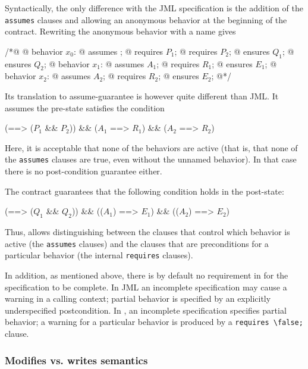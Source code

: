 \noindent
Syntactically, the only difference with the JML specification is the
addition of the \lstinline|assumes| clauses and allowing an 
anonymous behavior at the beginning of the contract. Rewriting the anonymous behavior with a name gives

\begin{listing}{1}
	/*@ 
	@ behavior $x_0$:
	@   assumes \true;
	@   requires $P_1$;
	@   requires $P_2$;
	@   ensures  $Q_1$;
	@   ensures  $Q_2$;
	@ behavior $x_1$:
	@   assumes $A_1$;
	@   requires $R_1$;
	@   ensures $E_1$;
	@ behavior $x_2$:
	@   assumes $A_2$;
	@   requires $R_2$;
	@   ensures $E_2$;
	@*/
\end{listing}

\noindent
Its translation to assume-guarantee is however quite different than JML.
It assumes the pre-state satisfies the condition

\begin{listing-nonumber}
  (\true ==> ($P_1$ && $P_2$)) && ($A_1$ ==> $R_1$) && ($A_2$ ==> $R_2$)
\end{listing-nonumber}
Here, it is acceptable that none of the behaviors are active (that is, that none of the \lstinline|assumes| clauses are true, even without the unnamed behavior). In that case there is no post-condition guarantee either.

The contract guarantees that the following condition holds in the post-state:

\begin{listing-nonumber}
(\true ==> ($Q_1$ && $Q_2$)) && (\old($A_1$) ==> $E_1$) && (\old($A_2$) ==> $E_2$)
\end{listing-nonumber}

Thus, \acsl allows distinguishing between the clauses that control
which behavior is active (the \lstinline|assumes| clauses) and the
clauses that are preconditions for a particular behavior (the internal
\lstinline|requires| clauses). 

In addition, as mentioned above, there is
by default no requirement in \acsl for the specification to be complete. In JML an incomplete specification may cause a warning in a calling context; partial behavior is specified by an explicitly underspecified postcondition. In \acsl, an incomplete specification specifies partial behavior; a warning for a particular behavior is produced by a \lstinline|requires \false;| clause.

\subsubsection*{Modifies vs. writes semantics}


